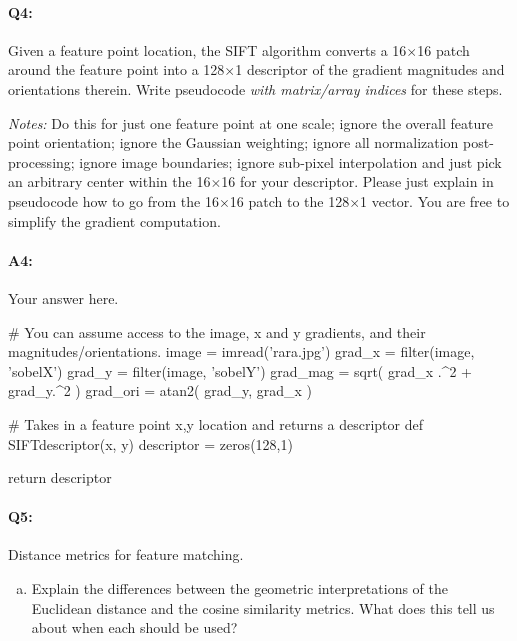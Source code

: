 \pagebreak
\paragraph{Q4:} Given a feature point location, the SIFT algorithm converts a 16$\times$16 patch around the feature point into a 128$\times$1 descriptor of the gradient magnitudes and orientations therein. Write pseudocode \emph{with matrix/array indices} for these steps.

\emph{Notes:} Do this for just one feature point at one scale; ignore the overall feature point orientation; ignore the Gaussian weighting; ignore all normalization post-processing; ignore image boundaries; ignore sub-pixel interpolation and just pick an arbitrary center within the 16$\times$16 for your descriptor. Please just explain in pseudocode how to go from the 16$\times$16 patch to the 128$\times$1 vector. You are free to simplify the gradient computation.

\paragraph{A4:} Your answer here.

\begin{python}
# You can assume access to the image, x and y gradients, and their magnitudes/orientations.
image = imread('rara.jpg')
grad_x = filter(image, 'sobelX')
grad_y = filter(image, 'sobelY')
grad_mag = sqrt( grad_x .^2 + grad_y.^2 )
grad_ori = atan2( grad_y, grad_x )

# Takes in a feature point x,y location and returns a descriptor
def SIFTdescriptor(x, y)
    descriptor = zeros(128,1)


    return descriptor
\end{python}





\pagebreak
\paragraph{Q5:} Distance metrics for feature matching.

\begin{enumerate}[(a)]
    \item Explain the differences between the geometric interpretations of the Euclidean distance and the cosine similarity metrics. What does this tell us about when each should be used?
\end{enumerate}

